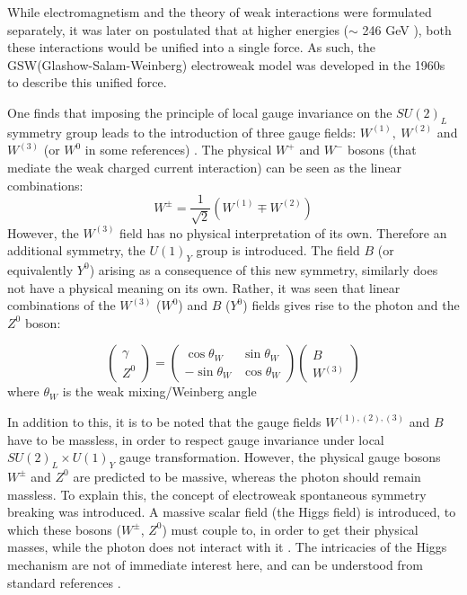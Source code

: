 While electromagnetism and the theory of weak interactions were formulated separately, it was later on postulated that at higher energies ($\sim$ 246 GeV \cite{pdg-ew}), both these interactions would be unified into a single force. As such, the GSW(Glashow-Salam-Weinberg) electroweak model was developed in the 1960s to describe this unified force. 

One finds that imposing the principle of local gauge invariance on the $SU(2)_{L}$ symmetry group leads to the introduction of three gauge fields: $W^{(1)},\ W^{(2)}$ and $W^{(3)}$ (or $W^{0}$ in some references) \cite{thomson_2013}. The physical $W^{+}$ and $W^{-}$ bosons (that mediate the weak charged current interaction) can be seen as the linear combinations: 
\begin{equation}
W^{\pm}=\dfrac{1}{\sqrt{2}}\left(W^{(1)}\mp W^{(2)}\right)
\end{equation}
However, the $W^{(3)}$ field has no physical interpretation of its own. Therefore an additional symmetry, the $U(1)_{Y}$ group is introduced. The field $B$ (or equivalently $Y^{0}$) arising as a consequence of this new symmetry, similarly does not have a physical meaning on its own. Rather, it was seen that linear combinations of the $W^{(3)}$ ($W^{0}$) and $B$ ($Y^{0}$) fields gives rise to the  photon and the $Z^{0}$ boson:

\begin{equation}
\begin{pmatrix} 
\gamma \\ 
Z^{0} 
\end{pmatrix}
= 
\begin{pmatrix}
\cos \theta_{W} & \sin \theta_{W} \\
-\sin \theta_{W} & \cos \theta_{W} 
\end{pmatrix}
\begin{pmatrix}
B \\
W^{(3)}
\end{pmatrix}
\end{equation}
where $\theta_{W}$ is the weak mixing/Weinberg angle

In addition to this, it is to be noted that the gauge fields $W^{(1),(2),(3)}$ and $B$ have to be massless, in order to respect gauge invariance under local $SU(2)_{L}\times U(1)_{Y}$ gauge transformation. However, the physical gauge bosons $W^{\pm}$ and $Z^{0}$ are predicted to be massive, whereas the photon should remain massless. To explain this, the concept of electroweak spontaneous symmetry breaking was introduced. A massive scalar field (the Higgs field) is introduced, to which these bosons ($W^{\pm}$, $Z^{0}$) must couple to, in order to get their physical masses, while the photon does not interact with it \cite{Dooling:207610}. The intricacies of the Higgs mechanism are not of immediate interest here, and can be understood from standard references \cite{thomson_2013, Griffiths:111880}.

